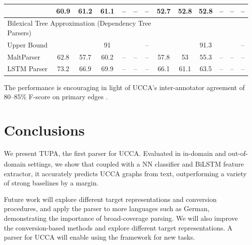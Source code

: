 \documentclass[a0,portrait]{a0poster}
\newcommand{\parser}[1]{TUPA\textsubscript{#1}}
\begin{document}
\begin{multicols}{2}
\begin{center}
\begin{tabular}{l|ccc|ccc||ccc|ccc}
		& 60.9 & 61.2 & 61.1 & -- & -- & --
		& 52.7 & 52.8 & 52.8 & -- & -- & -- \\
		\hline
		\multicolumn{8}{l}{\rule{0pt}{2ex} \footnotesize
		Bilexical Tree Approximation (Dependency Tree Parsers)} \\
		\small Upper Bound
		& & & \small 91 & & & \small --
		& & & \small 91.3 & & & \small -- \\
		MaltParser \cite{nivre2007maltparser}
		& 62.8 & 57.7 & 60.2 & -- & -- & --
		& 57.8 & 53 & 55.3 & -- & -- & -- \\
		LSTM Parser \cite{dyer2015transition}
		& 73.2 & 66.9 & 69.9 & -- & -- & --
		& 66.1 & 61.1 & 63.5 & -- & -- & --
	\end{tabular}
\end{center}

The performance is encouraging in light of
UCCA's inter-annotator agreement of 80--85\%
F-score on primary edges \cite{abend2013universal}.


\section*{Conclusions}

We present \parser{}, the first parser for UCCA.
Evaluated in in-domain and out-of-domain settings, we show that coupled with a
NN classifier and BiLSTM feature extractor,
it accurately predicts UCCA graphs from text, outperforming a variety of
strong baselines by a margin.

Future work will explore different target
representations and conversion procedures,
and apply the parser to more languages such as German,
demonstrating the importance of broad-coverage parsing.
We will also improve the conversion-based methods and explore different target representations.
A parser for UCCA will enable using the framework for new tasks.


\color{DarkSlateGray} %
\tiny


\end{multicols}
\end{document}
